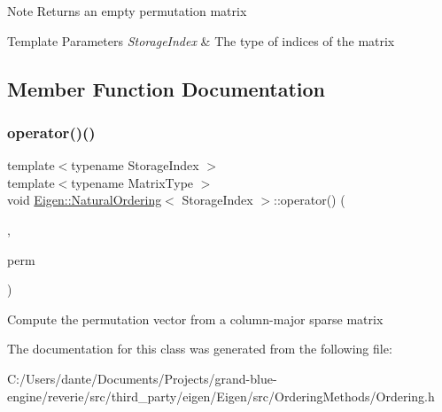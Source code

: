 \begin{DoxyNote}{Note}
Returns an empty permutation matrix 
\end{DoxyNote}

\begin{DoxyTemplParams}{Template Parameters}
{\em Storage\+Index} & The type of indices of the matrix \\
\hline
\end{DoxyTemplParams}


\subsection{Member Function Documentation}
\mbox{\label{class_eigen_1_1_natural_ordering_aa39e772105ed66da9e909f2a9385be37}} 
\subsubsection{\texorpdfstring{operator()()}{operator()()}}
{\footnotesize\ttfamily template$<$typename Storage\+Index $>$ \\
template$<$typename Matrix\+Type $>$ \\
void \mbox{\hyperlink{class_eigen_1_1_natural_ordering}{Eigen\+::\+Natural\+Ordering}}$<$ Storage\+Index $>$\+::operator() (\begin{DoxyParamCaption}\item[{const Matrix\+Type \&}]{,  }\item[{\mbox{\hyperlink{class_eigen_1_1_permutation_matrix}{Permutation\+Type}} \&}]{perm }\end{DoxyParamCaption})\hspace{0.3cm}{\ttfamily [inline]}}

Compute the permutation vector from a column-\/major sparse matrix 

The documentation for this class was generated from the following file\+:\begin{DoxyCompactItemize}
\item 
C\+:/\+Users/dante/\+Documents/\+Projects/grand-\/blue-\/engine/reverie/src/third\+\_\+party/eigen/\+Eigen/src/\+Ordering\+Methods/Ordering.\+h\end{DoxyCompactItemize}
